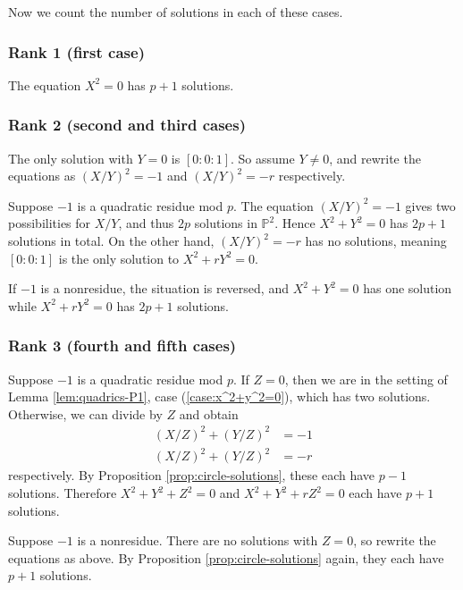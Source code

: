 \documentclass[10pt,a4paper]{amsart}
\numberwithin{equation}{section}
\numberwithin{figure}{section}
\theoremstyle{definition}
\theoremstyle{remark}
\theoremstyle{plain}
\theoremstyle{plain}
\theoremstyle{definition}
\theoremstyle{plain}
\theoremstyle{plain}
\begin{document}
Now we count the number of solutions in each of these cases.
\subsubsection*{Rank 1 (first case)}
The equation $X^2 = 0$ has $p + 1$ solutions.

\subsubsection*{Rank 2 (second and third cases)}
The only solution with $Y=0$ is $[0:0:1]$. So assume $Y \neq 0$, and rewrite the equations as $(X/Y)^2 = -1$ and $(X/Y)^2 = -r$ respectively.

Suppose $-1$ is a quadratic residue mod $p$. The equation $(X/Y)^2 = -1$ gives two possibilities for $X/Y$, and thus $2p$ solutions in $\mathbb{P}^2$. Hence $X^2 + Y^2 = 0$ has $2p + 1$ solutions in total. On the other hand, $(X/Y)^2 = -r$ has no solutions, meaning $[0:0:1]$ is the only solution to $X^2 + rY^2 = 0$.

If $-1$ is a nonresidue, the situation is reversed, and $X^2 + Y^2 = 0$ has one solution while $X^2 + rY^2 = 0$ has $2p + 1$ solutions.

\subsubsection*{Rank 3 (fourth and fifth cases)}
Suppose $-1$ is a quadratic residue mod $p$. If $Z = 0$, then we are in the setting of Lemma \ref{lem:quadrics-P1}, case (\ref{case:x^2+y^2=0}), which has two solutions. Otherwise, we can divide by $Z$ and obtain
\begin{align*}
	(X/Z)^2 + (Y/Z)^2 &= -1\\
	(X/Z)^2 + (Y/Z)^2 &= -r
\end{align*}
respectively. By Proposition \ref{prop:circle-solutions}, these each have $p - 1$ solutions. Therefore $X^2 + Y^2 + Z^2 = 0$ and $X^2 + Y^2 + rZ^2 = 0$ each have $p+1$ solutions.

Suppose $-1$ is a nonresidue. There are no solutions with $Z=0$, so rewrite the equations as above. By Proposition \ref{prop:circle-solutions} again, they each have $p + 1$ solutions.
\end{document}
